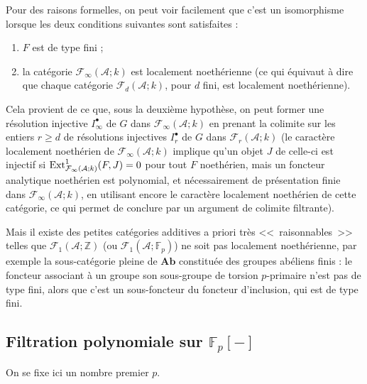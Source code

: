 \documentclass[a4paper,10pt]{article}
\newcommand{\A}{{\mathcal{A}}}
\newcommand{\F}{{\mathcal{F}}}
\theoremstyle{definition}
\theoremstyle{remark}
\begin{document}
Pour des raisons formelles, on peut voir facilement que c'est un isomorphisme lorsque les deux conditions suivantes sont satisfaites :
\begin{enumerate}
 \item $F$ est de type fini ;
\item la catégorie $\F_\infty(\A;k)$ est localement noethérienne (ce qui équivaut à dire que chaque catégorie $\F_d(\A;k)$, pour $d$ fini, est localement noethérienne).
\end{enumerate}

Cela provient de ce que, sous la deuxième hypothèse, on peut former une résolution injective $I^\bullet_\infty$ de $G$ dans $\F_\infty(\A;k)$ en prenant la colimite sur les entiers $r\geq d$ de résolutions injectives $I^\bullet_r$ de $G$ dans $\F_r(\A;k)$ (le caractère localement noethérien de $\F_\infty(\A;k)$ implique qu'un objet $J$ de celle-ci est injectif si ${\rm Ext}^1_{\F_\infty(\A;k)}(F,J)=0$ pour tout $F$ noethérien, mais un foncteur analytique noethérien est polynomial, et nécessairement de présentation finie dans $\F_\infty(\A;k)$, en utilisant encore le caractère localement noethérien de cette catégorie, ce qui permet de conclure par un argument de colimite filtrante).

Mais il existe des petites catégories additives a priori très <<~raisonnables~>> telles que $\F_1(\A;\mathbb{Z})$ (ou $\F_1(\A;\mathbb{F}_p)$) ne soit pas localement noethérienne, par exemple la sous-catégorie pleine de $\mathbf{Ab}$ constituée des groupes abéliens finis : le foncteur associant à un groupe son sous-groupe de torsion $p$-primaire n'est pas de type fini, alors que c'est un sous-foncteur du foncteur d'inclusion, qui est de type fini.

\subsection{Filtration polynomiale sur $\mathbb{F}_p[-]$}

On se fixe ici un nombre premier $p$.
\end{document}

